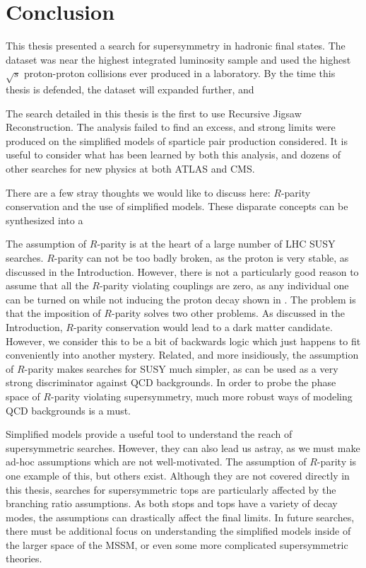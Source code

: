 
\chapter[Conclusion][Conclusion]{Conclusion} %

This thesis presented a search for supersymmetry in hadronic final states.
The dataset was near the highest integrated luminosity sample and used the highest $\sqrt{s}$ proton-proton collisions ever produced in a laboratory.
By the time this thesis is defended, the dataset will expanded further, and

The search detailed in this thesis is the first to use Recursive Jigsaw Reconstruction.
The analysis failed to find an excess, and strong limits were produced on the simplified models of sparticle pair production considered.
It is useful to consider what has been learned by both this analysis, and dozens of other searches for new physics at both ATLAS and CMS.

There are a few stray thoughts we would like to discuss here: $R$-parity conservation and the use of simplified models.
These disparate concepts can be synthesized into a

The assumption of $R$-parity is at the heart of a large number of LHC SUSY searches.
$R$-parity can not be too badly broken, as the proton is very stable, as discussed in the Introduction.
However, there is not a particularly good reason to assume that all the $R$-parity violating couplings are zero, as any individual one can be turned on while not inducing the proton decay shown in .
The problem is that the imposition of $R$-parity solves two other problems.
As discussed in the Introduction, $R$-parity conservation would lead to a dark matter candidate.
However, we consider this to be a bit of backwards logic which just happens to fit conveniently into another mystery.
Related, and more insidiously, the assumption of $R$-parity makes searches for SUSY much simpler, as \met can be used as a very strong discriminator against QCD backgrounds.
In order to probe the phase space of $R$-parity violating supersymmetry, much more robust ways of modeling QCD backgrounds is a must.

Simplified models provide a useful tool to understand the reach of supersymmetric searches. 
However, they can also lead us astray, as we must make ad-hoc assumptions which are not well-motivated.
The assumption of $R$-parity is one example of this, but others exist.
Although they are not covered directly in this thesis, searches for supersymmetric tops are particularly affected by the branching ratio assumptions.
As both stops and tops have a variety of decay modes, the assumptions can drastically affect the final limits.
In future searches, there must be additional focus on understanding the simplified models inside of the larger space of the MSSM, or even some more complicated supersymmetric theories.

